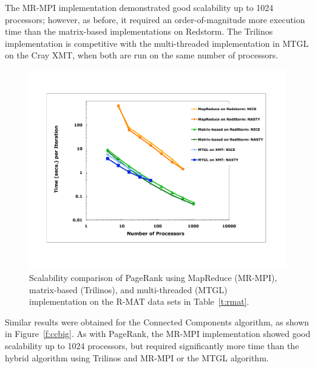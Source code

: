 The MR-MPI implementation demonstrated good scalability up to 1024
processors; however, as before, it required an order-of-magnitude more
execution time than the matrix-based implementations on Redstorm.  The
Trilinos implementation is competitive with the multi-threaded
implementation in MTGL on the Cray XMT, when both are run on the same
number of processors.

\begin{figure}[htb]
\includegraphics[width=\textwidth]{fig_pagerank_big.pdf}
\caption{Scalability comparison of PageRank using MapReduce (MR-MPI),
matrix-based (Trilinos), and multi-threaded (MTGL) implementation on
the R-MAT data sets in Table~\ref{t:rmat}.}
\label{f:prbig}
\end{figure}

Similar results were obtained for the Connected Components algorithm,
as shown in Figure~\ref{f:ccbig}.  As with PageRank, the MR-MPI
implementation showed good scalability up to 1024 processors, but
required significantly more time than the hybrid algorithm using
Trilinos and MR-MPI or the MTGL algorithm.

